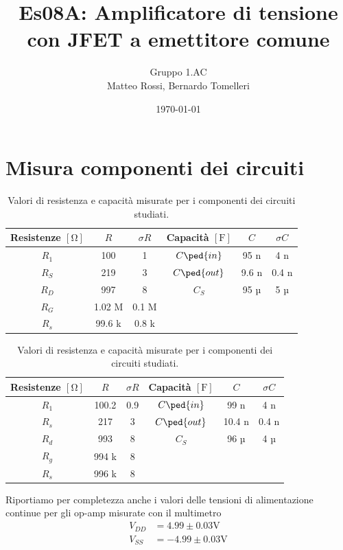 \documentclass[10pt, a4paper, italian]{article}
\author{Gruppo 1.AC \\ Matteo Rossi, Bernardo Tomelleri}
\title{Es08A: Amplificatore di tensione con JFET a emettitore comune}
\begin{document}
\date{\today}
\maketitle

\setcounter{section}{0}

\section{Misura componenti dei circuiti}
\begin{table}[htbp]
\centering
\begin{tabular}{cccccc}
\toprule
Resistenze $[\si{\ohm}]$ & $R$ & $\sigma R$ & Capacità $[\si{\F}]$ & $C$ &
$\sigma C$ \\
\midrule
\midrule
$R_1$	  & 100 	& 1 	 & $C\ped{in}$ & 95	n	 & 4 n \\
$R_S$	  & 219	& 3 	 & $C\ped{out}$ & 9.6 n	 & 0.4 n \\
$R_D$	  & 997		& 8	 	 & $C_S$ 		& 95  µ  & 5 µ \\
$R_G$	  & 1.02 M	& 0.1 M	 & & & \\
$R_s$	  & 99.6 k	& 0.8 k	 & & & \\
\bottomrule     
\end{tabular}
\caption{Valori di resistenza e capacità misurate per i componenti dei
circuiti studiati. \label{tab: rcmes_M}}
\end{table}

\begin{table}[htbp]
\centering
\begin{tabular}{cccccc}
\toprule
Resistenze $[\si{\ohm}]$ & $R$ & $\sigma R$ & Capacità $[\si{\F}]$ & $C$ &
$\sigma C$ \\
\midrule
\midrule
$R_1$	  & 100.2 	& 0.9 	 & $C\ped{in}$ & 99	n	 & 4 n \\
$R_s$	  & 217	& 3 	 & $C\ped{out}$ & 10.4 n	 & 0.4 n \\
$R_d$	  & 993		& 8	 	 & $C_S$ 		& 96  µ  & 4 µ \\
$R_g$	  & 994 k	& 8	 & & & \\
$R_s$	  & 996 k	& 8	 & & & \\
\bottomrule     
\end{tabular}
\caption{Valori di resistenza e capacità misurate per i componenti dei
circuiti studiati. \label{tab: rcmes_B}}
\end{table}

Riportiamo per completezza anche i valori delle tensioni di alimentazione
continue per gli op-amp misurate con il multimetro
\begin{align*}
V_{DD} &= 4.99 \pm 0.03 \si{\V} \\
V_{SS} &= -4.99 \pm 0.03 \si{\V}
\end{align*}
\end{document}
